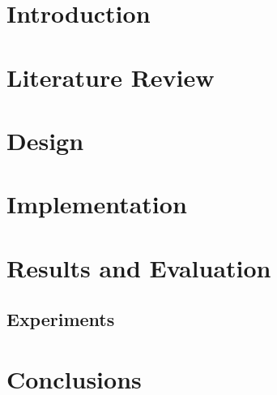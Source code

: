 \documentclass[12pt,a4paper]{report}
\author{M.A.P.P. Marasinghe}
\begin{document}



\clearpage

\linespread{2}


\onehalfspacing
\sloppy










\renewcommand\contentsname{Table of Contents\\}
\onehalfspacing
\linespread{1}
\tableofcontents
\clearpage


\chapter{Introduction}








\chapter{Literature Review}

\chapter{Design}

\chapter{Implementation}

\chapter{Results and Evaluation}
\section{Experiments}
\label{section:experiments}

\chapter{Conclusions}


\renewcommand\bibname{References}
 

\end{document}
